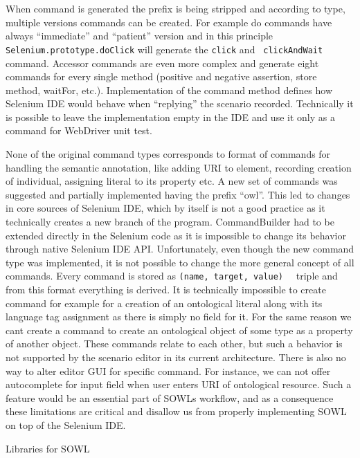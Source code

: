When command is generated the prefix is being stripped and according to type,
multiple versions commands can be created. For example do commands have always
``immediate'' and ``patient'' version and in this principle {\tt
Selenium.prototype.doClick} will generate the {\tt click} and {\tt
clickAndWait} command. Accessor commands are even more complex and generate
eight commands for every single method (positive and negative assertion, store
method, waitFor, etc.). Implementation of the command method defines how
Selenium IDE would behave when ``replying'' the scenario recorded. Technically it
is possible to leave the implementation empty in the IDE and use it only as a
command for WebDriver unit test. 

None of the original command types corresponds to format of commands for
handling the semantic annotation, like adding URI to element, recording
creation of individual, assigning literal to its property etc. A new set of
commands was suggested and partially implemented having the prefix ``owl''.
This led to changes in core sources of Selenium IDE, which by itself is not a good practice
as it technically creates a new branch of the program. CommandBuilder had to be
extended directly in the Selenium code as it is impossible to change its
behavior through native Selenium IDE API. Unfortunately, even though the new
command type was implemented, it is not possible to change the more general
concept of all commands. Every command is stored as {\tt (name, target, value)
}~ triple and from this format everything is
derived. It is technically impossible to create command for example for a
creation of an ontological literal 
along with its language tag assignment as there is simply no field for it. For the same
reason we cant create a command to create an ontological object of some type as
a property of another object.  These commands relate to each other, but such a
behavior is not supported by the scenario editor in its current architecture.
There is also no way to alter editor GUI for specific command. For instance, we
can not offer autocomplete for input field when user enters URI of ontological
resource. Such a feature would be an essential part of SOWLs workflow, and as
a consequence these limitations are critical and disallow us from properly
implementing SOWL on top of the Selenium IDE. 


\sec Libraries for SOWL

